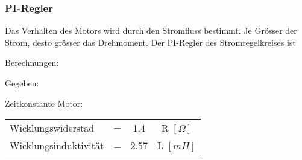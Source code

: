 \subsubsection{PI-Regler}
\label{subsubsec:PI_Regler}


Das Verhalten des Motors wird durch den Stromfluss bestimmt. Je Grösser der Strom, desto grösser das Drehmoment. Der PI-Regler des Stromregelkreises ist


Berechnungen:

Gegeben:

Zeitkonstante Motor:\\

\begin{tabular}{|l|c|c|c|}
Wicklungswiderstad & = & 1.4 & R $[\Omega]$ \\
Wicklungsinduktivität & = & 2.57 & L $[mH]$ \\
\end{tabular}

